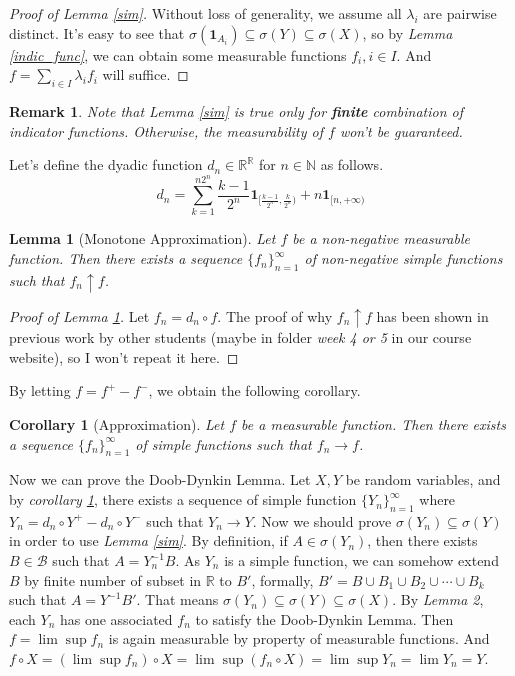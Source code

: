 \documentclass[12pt]{article}
\newcommand\bN{\mathbb{N}}
\newcommand\bR{\mathbb{R}}
\newcommand{\ind}[1]{\mathbf{1}_{#1}}
\newtheorem{lemma}{Lemma}
\newtheorem{corollary}{Corollary}
\newtheorem{remark}{Remark}
\begin{document}
	\begin{proof}[Proof of Lemma \ref{sim}]
		Without loss of generality, we assume all $\lambda_i$ are pairwise distinct. It's easy to see that $\sigma(\ind{A_i})\subseteq\sigma(Y)\subseteq \sigma(X)$, so by \textit{Lemma \ref{indic_func}}, we can obtain some measurable functions $f_i,i\in I$. And $f=\sum_{i\in I} \lambda_i f_i$ will suffice.
	\end{proof}

	\begin{remark}
		Note that \textit{Lemma \ref{sim}} is true only for \textbf{finite} combination of indicator functions. Otherwise, the measurability of $f$ won't be guaranteed.
	\end{remark}

	Let's define the dyadic function $d_n\in\bR^{\bR}$ for $n\in \bN$ as follows.
	$$d_n=\sum_{k=1}^{n2^n}\frac{k-1}{2^n}\ind{[\frac{k-1}{2^n},\frac{k}{2^n})}+n\ind{[n,+\infty)}$$
	
	\begin{lemma}[Monotone Approximation]\label{ma}
		Let $f$ be a non-negative measurable function. Then there exists a sequence $\{f_n\}_{n=1}^\infty$ of non-negative simple functions such that $f_n\uparrow f$.
	\end{lemma}

	\begin{proof}[Proof of Lemma \ref{ma}]
		Let $f_n=d_n\circ f$. The proof of why $f_n\uparrow f$ has been shown in previous work by other students (maybe in folder \textit{week 4 or 5} in our course website), so I won't repeat it here.
	\end{proof}

	By letting $f=f^+-f^-$, we obtain the following corollary.

	\begin{corollary}[Approximation]\label{app}
		Let $f$ be a measurable function. Then there exists a sequence $\{f_n\}_{n=1}^\infty$ of simple functions such that $f_n\rightarrow f$.
	\end{corollary}

	Now we can prove the Doob-Dynkin Lemma. Let $X,Y$ be random variables, and by \textit{corollary \ref{app}}, there exists a sequence of simple function $\{Y_n\}_{n=1}^\infty$ where $Y_n=d_n\circ Y^+-d_n\circ Y^-$ such that $Y_n\rightarrow Y$. Now we should prove $\sigma(Y_n)\subseteq\sigma(Y)$ in order to use \textit{Lemma \ref{sim}}. By definition, if $A\in \sigma(Y_n)$, then there exists $B\in \mathcal{B}$ such that $A=Y_n^{-1}B$. As $Y_n$ is a simple function, we can somehow extend $B$ by finite number of subset in $\bR$ to $B'$, formally, $B'=B\cup B_1\cup B_2\cup\cdots \cup B_k$ such that $A=Y^{-1}B'$. That means $\sigma(Y_n)\subseteq\sigma(Y)\subseteq\sigma(X)$. By \textit{Lemma 2}, each $Y_n$ has one associated $f_n$ to satisfy the Doob-Dynkin Lemma. Then $f=\lim\sup f_n$ is again measurable by property of measurable functions. And $f\circ X=(\lim\sup f_n)\circ X=\lim\sup(f_n\circ X)=\lim \sup Y_n=\lim Y_n=Y$.
	
	
	
\end{document}
